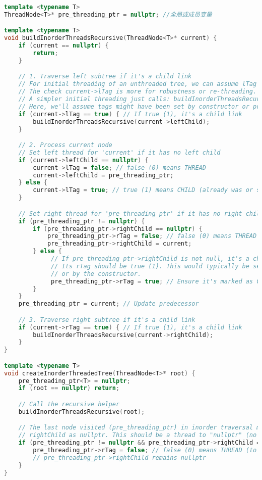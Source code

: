 \begin{lstlisting}[language=C++]
template <typename T>
ThreadNode<T>* pre_threading_ptr = nullptr; //全局或成员变量

template <typename T>
void buildInorderThreadsRecursive(ThreadNode<T>* current) {
    if (current == nullptr) {
        return;
    }

    // 1. Traverse left subtree if it's a child link
    // For initial threading of an unthreaded tree, we can assume lTag is true if leftChild is not null.
    // The check current->lTag is more for robustness or re-threading.
    // A simpler initial threading just calls: buildInorderThreadsRecursive(current->leftChild);
    // Here, we'll assume tags might have been set by constructor or previous operations.
    if (current->lTag == true) { // If true (1), it's a child link
        buildInorderThreadsRecursive(current->leftChild);
    }

    // 2. Process current node
    // Set left thread for 'current' if it has no left child
    if (current->leftChild == nullptr) {
        current->lTag = false; // false (0) means THREAD
        current->leftChild = pre_threading_ptr;
    } else {
        current->lTag = true; // true (1) means CHILD (already was or should be)
    }

    // Set right thread for 'pre_threading_ptr' if it has no right child
    if (pre_threading_ptr != nullptr) {
        if (pre_threading_ptr->rightChild == nullptr) {
            pre_threading_ptr->rTag = false; // false (0) means THREAD
            pre_threading_ptr->rightChild = current;
        } else {
             // If pre_threading_ptr->rightChild is not null, it's a child.
             // Its rTag should be true (1). This would typically be set when that child was processed
             // or by the constructor.
             pre_threading_ptr->rTag = true; // Ensure it's marked as CHILD
        }
    }
    pre_threading_ptr = current; // Update predecessor

    // 3. Traverse right subtree if it's a child link
    if (current->rTag == true) { // If true (1), it's a child link
        buildInorderThreadsRecursive(current->rightChild);
    }
}

template <typename T>
void createInorderThreadedTree(ThreadNode<T>* root) {
    pre_threading_ptr<T> = nullptr;
    if (root == nullptr) return;

    // Call the recursive helper
    buildInorderThreadsRecursive(root);

    // The last node visited (pre_threading_ptr) in inorder traversal might have its
    // rightChild as nullptr. This should be a thread to "nullptr" (no successor).
    if (pre_threading_ptr != nullptr && pre_threading_ptr->rightChild == nullptr) {
        pre_threading_ptr->rTag = false; // false (0) means THREAD (to nullptr)
        // pre_threading_ptr->rightChild remains nullptr
    }
}
\end{lstlisting}
